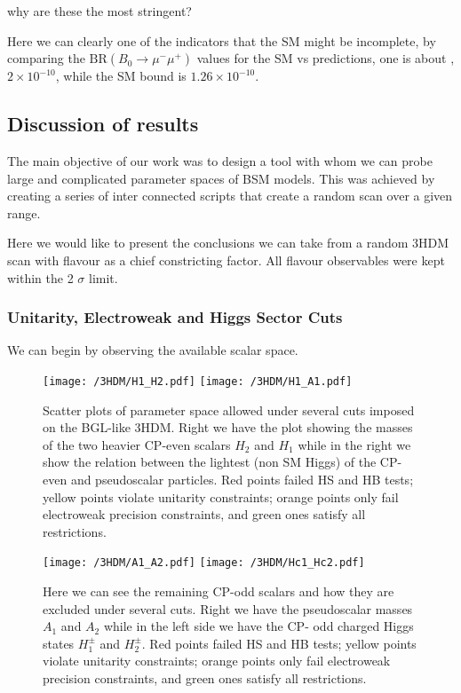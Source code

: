 { \color{red} why are these the most stringent? } 

Here we can clearly one of the indicators that the SM might be incomplete, by comparing the $\text{BR}(B_0 \rightarrow \mu^- \mu^+ )$ values for the SM vs predictions, one is about ,$2\times10^{-10}$, while the SM bound is $1.26\times10^{-10}$. 


\subsection{Discussion of results}

The main objective of our work was to design a tool with whom we can probe large and complicated parameter spaces of BSM models. This was achieved by creating a series of inter connected scripts that create a random scan over a given range. 

Here we would like to present the conclusions we can take from a random 3HDM scan with flavour as a chief constricting factor. All flavour observables were kept within the 2 $\sigma$ limit.

\subsubsection{Unitarity, Electroweak and Higgs Sector Cuts }

We can begin by observing the available scalar space.

\begin{figure}[H]
	\centering
	\texttt{[image: /3HDM/H1\_H2.pdf]}
	\texttt{[image: /3HDM/H1\_A1.pdf]}
	\caption{Scatter plots of parameter space allowed under  several cuts imposed on the BGL-like 3HDM. Right we have the plot showing the masses of the two heavier CP-even scalars $H_2$ and $H_1$ while in the right we show the relation between the lightest (non SM Higgs) of the CP-even and pseudoscalar particles. Red points failed HS and HB tests; yellow points violate unitarity constraints; orange points only fail electroweak precision constraints, and green ones satisfy all restrictions.}
	\label{fig:H1_A1_Plots}
\end{figure}	

\begin{figure}[H]
	\centering
	\texttt{[image: /3HDM/A1\_A2.pdf]}
	\texttt{[image: /3HDM/Hc1\_Hc2.pdf]}
	\caption{}
	\label{fig:Other_H_plots}
	\caption{Here we can see the remaining CP-odd scalars and how they are excluded under several cuts. Right we have the pseudoscalar masses $A_1$ and $A_2$ while in the left side we have the CP- odd charged Higgs states $H_1^\pm$ and $H_2^\pm$. Red points failed HS and HB tests; yellow points violate unitarity constraints; orange points only fail electroweak precision constraints, and green ones satisfy all restrictions.}
\end{figure}	

